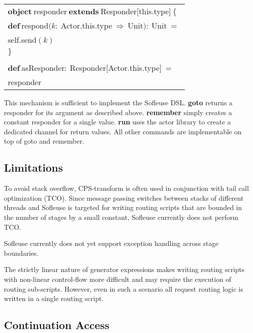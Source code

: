 \documentclass{sig-alternate}
\begin{document}
\medskip
\begin{tabular}{l}                                
$\mathbf{object}\ $responder$\ \mathbf{extends}\ $Responder[this.type]$\ \{$\\
\hspace{2ex}$\mathbf{def}\ $respond$(\mathit{k}:\ $Actor.this.type$\ \Rightarrow\ $Unit$):\ $Unit$\ =\ $\\
\hspace{4ex}self.send$(\mathit{k})$\\
$\}$\\
\\
$\mathbf{def}\ $asResponder$:\ $Responder[Actor.this.type]$\ =\ $\\
\hspace{2ex}responder
\end{tabular}
\medskip

This mechanism is sufficient to implement the Sofleuse DSL. \textbf{goto} returns a responder for
its argument as described above. \textbf{remember} simply creates a constant responder for a single
value. \textbf{run} uses the actor library to create a dedicated channel for return values. All
other commands are implementable on top of goto and remember.

                                                       
\subsection{Limitations}

To avoid stack overflow, CPS-transform is often used in conjunction with tail call optimization
(TCO). Since message passing switches between stacks of different threads and Sofleuse is targeted
for writing routing scripts that are bounded in the number of stages by a small constant, Sofleuse
currently does not perform TCO.
    
Sofleuse currently does not yet support exception handling across stage boundaries.

The strictly linear nature of generator expressions makes writing routing scripts with
non-linear control-flow more difficult and may require the execution of routing sub-scripts.  
However, even in such a scenario all request routing logic is written in a single routing
script.



\subsection{Continuation Access}
\end{document}
